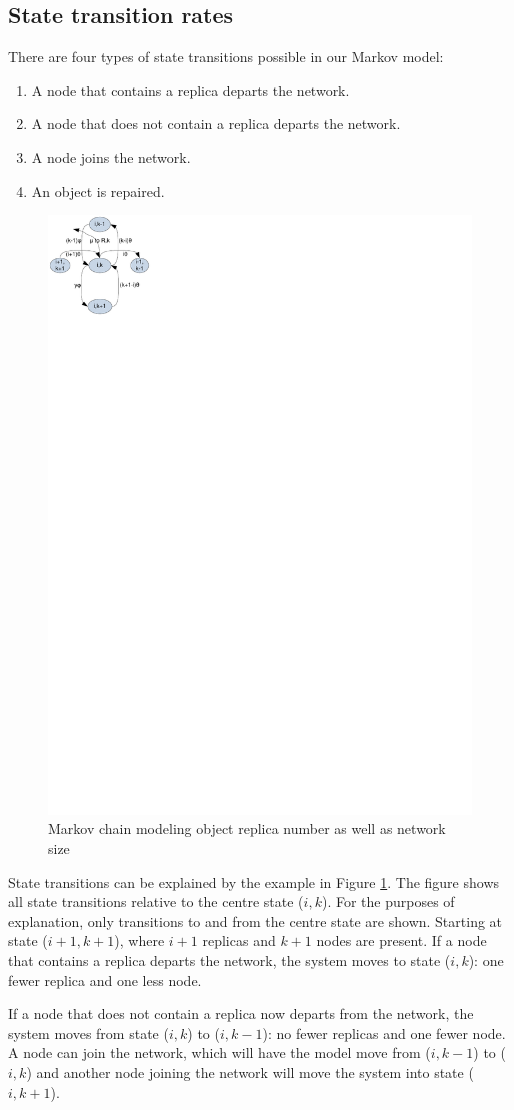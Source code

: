 \documentclass[10pt,a4paper,conference]{IEEEtran}
\begin{document}
\subsection{State transition rates}

There are four types of state transitions possible in our Markov model:
\begin{enumerate}
\item A node that contains a replica departs the network.
\item A node that does not contain a replica departs the network.
\item A node joins the network.
\item An object is repaired.
\end{enumerate}


\begin{figure}[htbp]
 \centering
 \includegraphics[clip=true, viewport=0.0cm 24.5cm 5.0cm 30cm, width=0.4\columnwidth]{Markov_example}
 \caption{Markov chain modeling object replica number as well as network size}
 \label{fig_markov_example}
\end{figure}

State transitions can be explained by the example in Figure \ref{fig_markov_example}. The figure shows all state transitions relative to the centre state ($i,k$). For the purposes of explanation, only transitions to and from the centre state are shown. Starting at state ($i+1,k+1$), where $i+1$ replicas and $k+1$ nodes are present. If a node that contains a replica departs the network, the system moves to state ($i,k$): one fewer replica and one less node.

If a node that does not contain a replica now departs from the network, the system moves from state ($i,k$) to ($i,k-1$): no fewer replicas and one fewer node. A node can join the network, which will have the model move from ($i,k-1$) to ($i,k$) and another node joining the network will move the system into state ($i,k+1$).
\end{document}
